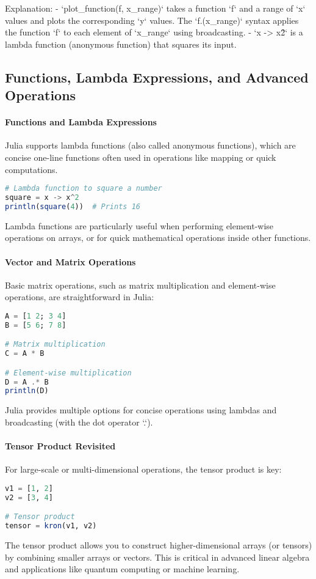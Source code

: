 Explanation:
- `plot\_function(f, x\_range)` takes a function `f` and a range of `x` values and plots the corresponding `y` values. The `f.(x\_range)` syntax applies the function `f` to each element of `x\_range` using broadcasting.
- `x -> x\^2` is a lambda function (anonymous function) that squares its input.

\subsection{Functions, Lambda Expressions, and Advanced Operations}

\paragraph{Functions and Lambda Expressions}
Julia supports lambda functions (also called anonymous functions), which are concise one-line functions often used in operations like mapping or quick computations.

\begin{lstlisting}[language=Julia]
# Lambda function to square a number
square = x -> x^2
println(square(4))  # Prints 16
\end{lstlisting}

Lambda functions are particularly useful when performing element-wise operations on arrays, or for quick mathematical operations inside other functions.

\paragraph{Vector and Matrix Operations}
Basic matrix operations, such as matrix multiplication and element-wise operations, are straightforward in Julia:

\begin{lstlisting}[language=Julia]
A = [1 2; 3 4]
B = [5 6; 7 8]

# Matrix multiplication
C = A * B

# Element-wise multiplication
D = A .* B
println(D)
\end{lstlisting}

Julia provides multiple options for concise operations using lambdas and broadcasting (with the dot operator `.`).

\paragraph{Tensor Product Revisited}
For large-scale or multi-dimensional operations, the tensor product is key:

\begin{lstlisting}[language=Julia]
v1 = [1, 2]
v2 = [3, 4]

# Tensor product
tensor = kron(v1, v2)
\end{lstlisting}

The tensor product allows you to construct higher-dimensional arrays (or tensors) by combining smaller arrays or vectors. This is critical in advanced linear algebra and applications like quantum computing or machine learning.
